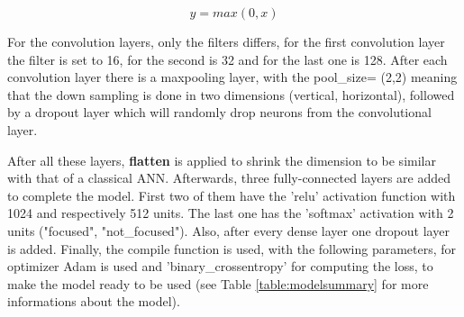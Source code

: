 \begin{equation}
    y = max(0,x)
\end{equation}

For the convolution layers, only the filters differs, for the first convolution layer the filter is set to 16, for the second is 32 and for the last one is 128. After each convolution layer there is a maxpooling layer, with the pool\_size= (2,2) meaning that the down sampling is done in two dimensions (vertical, horizontal), followed by a dropout layer which will randomly drop neurons from the convolutional layer. \par

After all these layers, \textbf{flatten} is applied to shrink the dimension to be similar with that of a classical ANN. Afterwards, three fully-connected layers are added to complete the model. First two of them have the 'relu' activation function with 1024 and respectively 512 units. The last one has the 'softmax' activation with 2 units ("focused", "not\_focused"). Also, after every dense layer one dropout layer is added. Finally, the compile function is used, with the following parameters, for optimizer Adam is used and 'binary\_crossentropy' for computing the loss, to make the model ready to be used (see Table \ref{table:modelsummary} for more informations about the model). 

